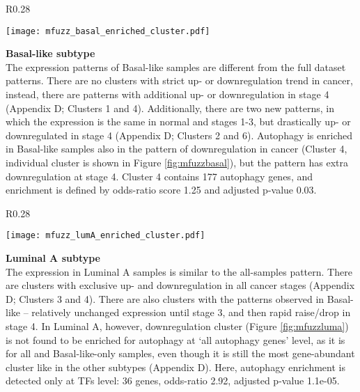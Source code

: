        
        \begin{wrapfigure}{R}{0.28\textwidth}
        \hfill
        \captionsetup{justification=centering}
        \centerline{ \texttt{[image: mfuzz\_basal\_enriched\_cluster.pdf]}}
        \vspace*{-8mm}
        \caption[Basal-like subtype downregulation cluster]{\label{fig:mfuzzbasal}Basal-like\newline downregulation cluster}
        \end{wrapfigure}

        
        \textbf{Basal-like subtype}\\
        The expression patterns of Basal-like samples are different from the full dataset patterns. There are no clusters with strict up- or downregulation trend in cancer, instead, there are patterns with additional up- or downregulation in stage 4 (Appendix D; Clusters 1 and 4). Additionally, there are two new patterns, in which the expression is the same in normal and stages 1-3, but drastically up- or downregulated in stage 4 (Appendix D; Clusters 2 and 6).  
        Autophagy is enriched in Basal-like samples also in the pattern of downregulation in cancer (Cluster 4, individual cluster is shown in Figure \ref{fig:mfuzzbasal}), but the pattern has extra downregulation at stage 4. Cluster 4 contains 177 autophagy genes, and enrichment is defined by odds-ratio score 1.25 and adjusted p-value 0.03. 
        
        
        \begin{wrapfigure}{R}{0.28\textwidth}
        \hfill
        \captionsetup{justification=centering}
        \centerline{ \texttt{[image: mfuzz\_lumA\_enriched\_cluster.pdf]}}
        \vspace*{-8mm}
        \caption[Luminal A subtype downregulation cluster]{\label{fig:mfuzzluma}Luminal A \newline downregulation cluster}
        \end{wrapfigure}
        
        
        \textbf{Luminal A subtype}\\   
        The expression in Luminal A samples is similar to the all-samples pattern. There are clusters with exclusive up- and downregulation in all cancer stages (Appendix D; Clusters 3 and 4). There are also clusters with the patterns observed in Basal-like -- relatively unchanged expression until stage 3, and then rapid raise/drop in stage 4. In Luminal A, however, downregulation cluster (Figure \ref{fig:mfuzzluma}) is not found to be enriched for autophagy at ‘all autophagy genes' level, as it is for all and Basal-like-only samples, even though it is still the most gene-abundant cluster like in the other subtypes (Appendix D). Here, autophagy enrichment is detected only at TFs level: 36 genes, odds-ratio 2.92, adjusted p-value 1.1e-05.\vspace{5mm} \break
        
